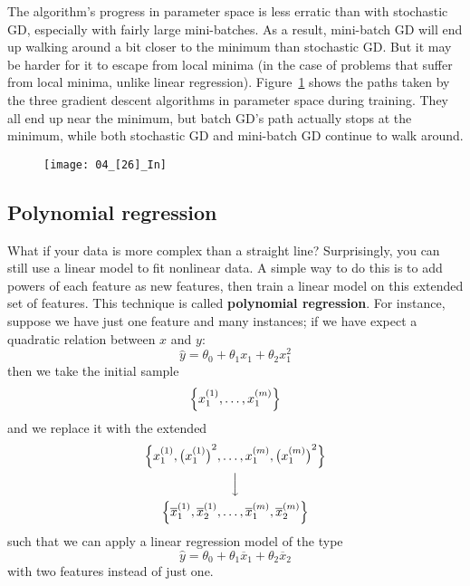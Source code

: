 The algorithm's progress in parameter space is less erratic than with stochastic GD, especially with fairly large mini-batches. As a result, mini-batch GD will end up walking around a bit closer to the minimum than stochastic GD. But it may be harder for it to escape from local minima (in the case of problems that suffer from local minima, unlike linear regression). Figure~\ref{04_[26]_In} shows the paths taken by the three gradient descent algorithms in parameter space during training. They all end up near the minimum, but batch GD's path actually stops at the minimum, while both stochastic GD and mini-batch GD continue to walk around.
\begin{figure}[h!t]
\centering
\texttt{[image: 04\_[26]\_In]}
\caption{}\label{04_[26]_In}
\end{figure}
\subsection{Polynomial regression}\label{sec:Polynomial_regression}
What if your data is more complex than a straight line? Surprisingly, you can still use a linear model to fit nonlinear data. A simple way to do this is to add powers of each feature as new features, then train a linear model on this extended set of features. This technique is called \textbf{polynomial regression}. For instance, suppose we have just one feature and many instances; if we have expect a quadratic relation between $x$ and $y$:
\begin{equation}\label{PolynomialRegression}
\widehat{y}=\theta_0+\theta_1x_1+\theta_2x_1^2
\end{equation}
then we take the initial sample
\begin{equation}
\Bigl\{x_1^{(1)},\ldots,x_1^{(m)}\Bigr\}
\end{equation}
and we replace it with the extended
\begin{equation}
\begin{matrix}
\Bigl\{x_1^{(1)},{\bigl(x_1^{(1)}\bigr)}^2,\ldots,x_1^{(m)},{\bigl(x_1^{(m)}\bigr)}^2\Bigr\} \vspace{4pt}\\
\Big\downarrow \vspace{4pt}\\
\Bigl\{\overline{x}_1^{(1)},\overline{x}_2^{(1)},\ldots,\overline{x}_1^{(m)},\overline{x}_2^{(m)}\Bigr\}
\end{matrix}
\end{equation}
such that we can apply a linear regression model of the type
\begin{equation}
\widehat{y}=\theta_0+\theta_1\overline{x}_1+\theta_2\overline{x}_2
\end{equation}
with two features instead of just one.

